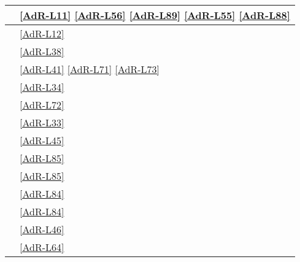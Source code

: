 \begin{longtable}{|m{12cm}|>{\centering}m{2cm}|}
	\hline \coderef{Framework::View::GUIContainer} & \ref{AdR-L11} \linebreak \ref{AdR-L56} \linebreak \ref{AdR-L89} \linebreak \ref{AdR-L55} \linebreak \ref{AdR-L88} \tabularnewline
	\hline \coderef{Framework::View::GUI::Label} & \ref{AdR-L12} \tabularnewline
	\hline \coderef{Framework::View::GUI::InputFile} & \ref{AdR-L38} \tabularnewline
	\hline \coderef{Framework::View::GUI::Button} & \ref{AdR-L41} \linebreak \ref{AdR-L71} \linebreak \ref{AdR-L73} \tabularnewline
	\hline \coderef{Framework::View::GUI::TextEdit} & \ref{AdR-L34} \tabularnewline
	\hline \coderef{Framework::View::GUI::InputText} & \ref{AdR-L72} \tabularnewline
	\hline \coderef{Framework::View::GUI::TextView} & \ref{AdR-L33} \tabularnewline
	\hline \coderef{Framework::View::GUI::Image} & \ref{AdR-L45} \tabularnewline
	\hline \coderef{Framework::View::GUI::CheckBox} & \ref{AdR-L85} \tabularnewline
	\hline \coderef{Framework::View::GUI::CheckBoxGroup} & \ref{AdR-L85} \tabularnewline
	\hline \coderef{Framework::View::GUI::RadioButton} & \ref{AdR-L84} \tabularnewline
	\hline \coderef{Framework::View::GUI::RadioButtonGroup} & \ref{AdR-L84} \tabularnewline
	\hline \coderef{Framework::View::GUI::PieChart} & \ref{AdR-L46} \tabularnewline
	\hline \coderef{Framework::View::GUI::BarChart} & \ref{AdR-L64} \tabularnewline
	

\end{longtable}
